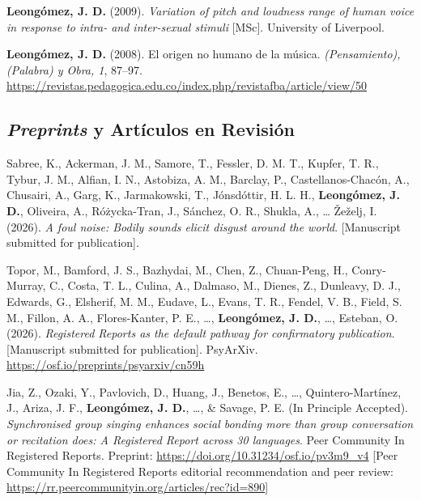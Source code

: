 \documentclass[11pt,a4paper,]{awesome-cv}
\begin{document}
\textcolor{teal}{\faStar} \textbf{Leongómez, J. D.} (2009).
\emph{Variation of pitch and loudness range of human voice in response
to intra- and inter-sexual stimuli} {[}MSc{]}. University of Liverpool.

\textcolor{teal}{\faStar} \textbf{Leongómez, J. D.} (2008). El origen no
humano de la música. \emph{(Pensamiento), (Palabra) y Obra, 1}, 87--97.
\url{https://revistas.pedagogica.edu.co/index.php/revistafba/article/view/50}

\endgroup

\subsection{\texorpdfstring{\textbf{\textit{Preprints} y Artículos en Revisión}}{}}\label{section-2}

\begingroup
  \footnotesize
  \setlength{\parindent}{-0.5in}
  \setlength{\leftskip}{0.5in}

Sabree, K., Ackerman, J. M., Samore, T., Fessler, D. M. T., Kupfer, T.
R., Tybur, J. M., Alfian, I. N., Astobiza, A. M., Barclay, P.,
Castellanos-Chacón, A., Chusairi, A., Garg, K., Jarmakowski, T.,
Jónsdóttir, H. L. H., \textbf{Leongómez, J. D.}, Oliveira, A.,
Różycka-Tran, J., Sánchez, O. R., Shukla, A., \ldots{} Žeželj, I.
(2026). \emph{A foul noise: Bodily sounds elicit disgust around the
world}. {[}Manuscript submitted for publication{]}.

Topor, M., Bamford, J. S., Bazhydai, M., Chen, Z., Chuan-Peng, H.,
Conry-Murray, C., Costa, T. L., Culina, A., Dalmaso, M., Dienes, Z.,
Dunleavy, D. J., Edwards, G., Elsherif, M. M., Eudave, L., Evans, T. R.,
Fendel, V. B., Field, S. M., Fillon, A. A., Flores-Kanter, P. E.,
\ldots, \textbf{Leongómez, J. D.}, \ldots, Esteban, O. (2026).
\emph{Registered Reports as the default pathway for confirmatory
publication}. {[}Manuscript submitted for publication{]}. PsyArXiv.
\url{https://osf.io/preprints/psyarxiv/cn59h}

Jia, Z., Ozaki, Y., Pavlovich, D., Huang, J., Benetos, E., \ldots,
Quintero-Martínez, J., Ariza, J. F., \textbf{Leongómez, J. D.}, \ldots,
\& Savage, P. E. (In Principle Accepted). \emph{Synchronised group
singing enhances social bonding more than group conversation or
recitation does: A Registered Report across 30 languages}. Peer
Community In Registered Reports. Preprint:
\url{https://doi.org/10.31234/osf.io/pv3m9_v4} {[}Peer Community In
Registered Reports editorial recommendation and peer review:
\url{https://rr.peercommunityin.org/articles/rec?id=890}{]}
\end{document}
